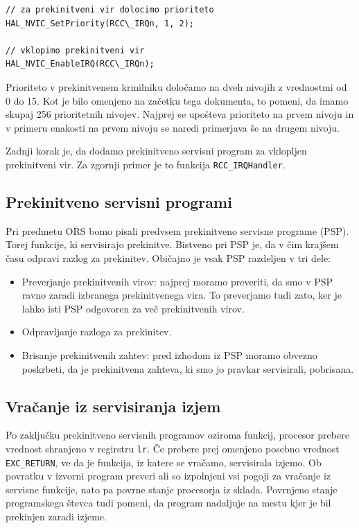 \documentclass[12pt,letterpaper]{article}
\begin{document}
\begin{center}
\begin{lstlisting}[style=CStyle]
// za prekinitveni vir dolocimo prioriteto
HAL_NVIC_SetPriority(RCC\_IRQn, 1, 2);

// vklopimo prekinitveni vir
HAL_NVIC_EnableIRQ(RCC\_IRQn); 
\end{lstlisting}
\end{center}

Prioriteto v prekinitvenem krmilniku določamo na dveh nivojih z vrednostmi od 0 do 15. Kot je bilo omenjeno na začetku tega dokumenta, to pomeni, da imamo skupaj 256 prioritetnih nivojev. Najprej se upošteva prioriteto na prvem nivoju in v primeru enakosti na prvem nivoju se naredi primerjava še na drugem nivoju.

Zadnji korak je, da dodamo prekinitveno servisni program za vklopljen prekinitveni vir. Za zgornji primer je to funkcija \texttt{RCC\_IRQHandler}.

\subsection*{Prekinitveno servisni programi}

Pri predmetu ORS bomo pisali predvsem prekinitveno servisne programe (PSP). Torej funkcije, ki servisirajo prekinitve. Bistveno pri PSP je, da v čim krajšem času odpravi razlog za prekinitev. Običajno je vsak PSP razdeljen v tri dele:

\begin{itemize}
    \item Preverjanje prekinitvenih virov: najprej moramo preveriti, da smo v PSP ravno zaradi izbranega prekinitvenega vira. To preverjamo tudi zato, ker je lahko isti PSP odgovoren za več prekinitvenih virov.
    
    \item Odpravljanje razloga za prekinitev.
    
    \item Brisanje prekinitvenih zahtev: pred izhodom iz PSP moramo obvezno poskrbeti, da je prekinitvena zahteva, ki smo jo pravkar servisirali, pobrisana.
\end{itemize}

\subsection*{Vračanje iz servisiranja izjem}

Po zaključku prekinitveno servisnih programov oziroma funkcij, procesor prebere vrednost shranjeno v regirstru \texttt{lr}. Če prebere prej omenjeno posebno vrednost \texttt{EXC\_RETURN}, ve da je funkcija, iz katere se vračamo, servisirala izjemo. Ob povratku v izvorni program preveri ali so izpolnjeni vsi pogoji za vračanje iz servisne funkcije, nato pa povrne stanje procesorja iz sklada. Povrnjeno stanje programskega števca tudi pomeni, da program nadaljuje na mestu kjer je bil prekinjen zaradi izjeme.
\end{document}
